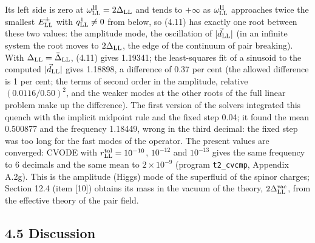 \documentclass[
  10pt,
]{article}
\begin{document}
Its left side is zero at \(\omega^{\rm H}_{\rm LL}=2\Delta_{\rm LL}\)
and tends to \(+\infty\) as \(\omega^{\rm H}_{\rm LL}\) approaches twice
the smallest \(E^\pm_{\rm LL}\) with \(q^1_{\rm LL}\neq0\) from below,
so (4.11) has exactly one root between these two values: the amplitude
mode, the oscillation of \(\lvert\vec d_{\rm LL}\rvert\) (in an infinite
system the root moves to \(2\Delta_{\rm LL}\), the edge of the continuum
of pair breaking). With \(\Delta_{\rm LL}=\bar\Delta_{\rm LL}\), (4.11)
gives 1.19341; the least-squares fit of a sinusoid to the computed
\(\lvert\vec d_{\rm LL}\rvert\) gives 1.18898, a difference of 0.37 per
cent (the allowed difference is 1 per cent; the terms of second order in
the amplitude, relative \((0.0116/0.50)^2\), and the weaker modes at the
other roots of the full linear problem make up the difference). The
first version of the solvers integrated this quench with the implicit
midpoint rule and the fixed step 0.04; it found the mean 0.500877 and
the frequency 1.18449, wrong in the third decimal: the fixed step was
too long for the fast modes of the operator. The present values are
converged: CVODE with \(r^{\rm tol}_{\rm LL}=10^{-10}\), \(10^{-12}\)
and \(10^{-13}\) gives the same frequency to 6 decimals and the same
mean to \(2\times10^{-9}\) (program \texttt{t2\_cvcmp}, Appendix A.2g).
This is the amplitude (Higgs) mode of the superfluid of the spinor
charges; Section 12.4 (item {[}10{]}) obtains its mass in the vacuum of
the theory, \(2\Delta^{\rm vac}_{\rm LL}\), from the effective theory of
the pair field.

\hypertarget{discussion-2}{%
\subsection{4.5 Discussion}\label{discussion-2}}
\end{document}
